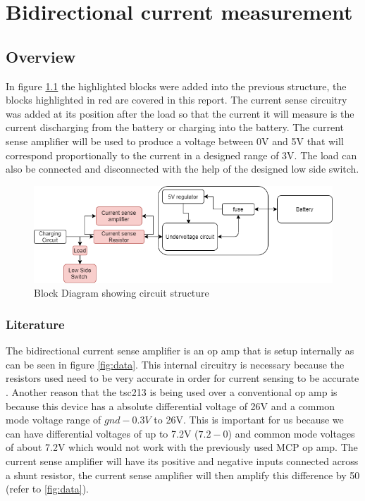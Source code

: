 \chapter{Bidirectional current measurement}\label{ch:bidircurrent}
\section{Overview}
In figure \ref{fig:block} the highlighted blocks were added into the previous structure, the blocks highlighted in red are covered in this report. The current sense circuitry was added at its position after the load so that the current it will measure is the current discharging from the battery or charging into the battery. The current sense amplifier will be used to produce a voltage between 0V and 5V that will correspond proportionally to the current in a designed range of 3V. The load can also be connected and disconnected with the help of the designed low side switch.


\begin{figure}[!htb]
\centering
\includegraphics[scale=0.5]{./Figures/block}
\caption{Block Diagram showing circuit structure}
\label{fig:block}
\end{figure}

\subsection{Literature}
The bidirectional current sense amplifier is an op amp that is setup internally as can be seen in figure \ref{fig:data}. This internal circuitry is necessary because the resistors used need to be very accurate in order for current sensing to be accurate \cite{utube}. Another reason that the tsc213 is being used over a conventional op amp is because this device has a absolute differential voltage of 26V and a common mode voltage range of $gnd-0.3V$ to 26V. This is important for us because we can have differential voltages of up to 7.2V ($7.2-0$) and common mode voltages of about 7.2V which would not work with the previously used MCP op amp. The current sense amplifier will have its positive and negative inputs connected across a shunt resistor, the current sense amplifier will then amplify this difference by 50 (refer to \ref{fig:data}).


